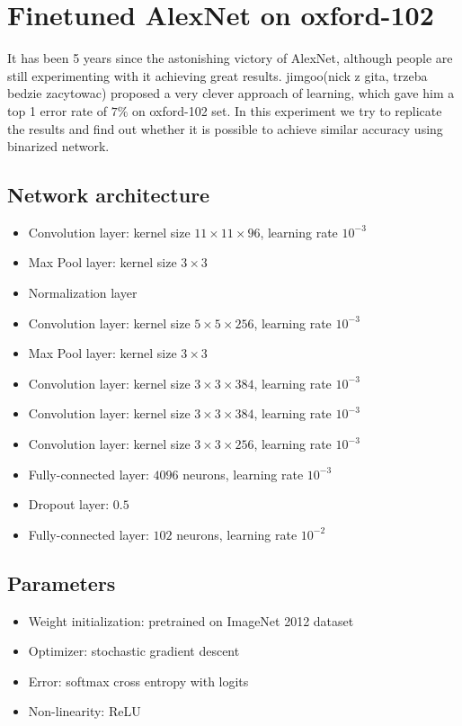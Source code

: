 \documentclass[licencjacka]{pracamgr}
\begin{document}
	\section{Finetuned AlexNet on oxford-102}
	It has been 5 years since the astonishing victory of AlexNet, although people are still experimenting with it achieving great results. jimgoo(nick z gita, trzeba bedzie zacytowac) proposed a very clever approach of learning, which gave him a top 1 error rate of $7\%$ on oxford-102 set. In this experiment we try to replicate the results and find out whether it is possible to achieve similar accuracy using binarized network. 
		\subsection{Network architecture}
			\begin{itemize}
			\item Convolution layer: kernel size $11 \times 11 \times 96$, learning rate $10^{-3}$
			\item Max Pool layer: kernel size $3 \times 3$
			\item Normalization layer
			\item Convolution layer: kernel size $5 \times 5 \times 256$, learning rate $10^{-3}$
			\item Max Pool layer: kernel size $3 \times 3$
			\item Convolution layer: kernel size $3 \times 3 \times 384$, learning rate $10^{-3}$
			\item Convolution layer: kernel size $3 \times 3 \times 384$, learning rate $10^{-3}$
			\item Convolution layer: kernel size $3 \times 3 \times 256$, learning rate $10^{-3}$
			\item Fully-connected layer: $4096$ neurons, learning rate $10^{-3}$
			\item Dropout layer: $0.5$
			\item Fully-connected layer: $102$ neurons, learning rate $10^{-2}$
			\end{itemize}
		\subsection{Parameters}
			\begin{itemize}
			\item Weight initialization: pretrained on ImageNet 2012 dataset
			\item Optimizer: stochastic gradient descent
			\item Error: softmax cross entropy with logits
			\item Non-linearity: ReLU
			\end{itemize}
\end{document}
